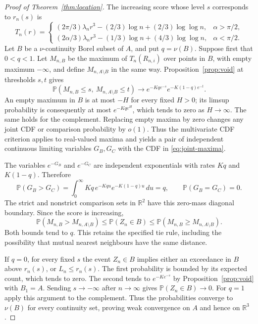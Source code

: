 \documentclass[11pt]{article}
\newcommand{\PP}{\mathbb P}
\begin{document}
\begin{proof}[Proof of Theorem~\ref{thm:location}]
The increasing score whose level $s$ corresponds to $r_n(s)$ is
\[
 T_n(r)=
 \begin{cases}
  (2\pi/3)\lambda_nr^3-(2/3)\log n+(2/3)\log\log n,&\alpha>\pi/2,\\
  (2\alpha/3)\lambda_nr^3-(1/3)\log n+(4/3)\log\log n,&\alpha<\pi/2.
 \end{cases}
\]
Let $B$ be a $\nu$-continuity Borel subset of $A$, and put $q=\nu(B)$.
Suppose first that $0<q<1$. Let $M_{n,B}$ be the maximum of
$T_n(R_{n,i})$ over points in $B$, with empty maximum $-\infty$, and
define $M_{n,A\setminus B}$ in the same way. Proposition~\ref{prop:void}
at thresholds $s,t$ gives
\begin{equation}\label{eq:joint-maxima}
 \PP(M_{n,B}\leq s,\ M_{n,A\setminus B}\leq t)
 \longrightarrow e^{-Kq e^{-s}}e^{-K(1-q)e^{-t}}.
\end{equation}
An empty maximum in $B$ is at most $-H$ for every fixed $H>0$; its
limsup probability is consequently at most $e^{-Kq e^H}$, which tends
to zero as $H\to\infty$. The same holds for the complement. Replacing
empty maxima by zero changes any joint CDF or comparison probability by
$o(1)$. Thus the multivariate CDF criterion applies to real-valued maxima
and yields a pair of independent continuous limiting variables $G_B,G_C$
with the CDF in \eqref{eq:joint-maxima}.

The variables $e^{-G_B}$ and $e^{-G_C}$ are independent exponentials
with rates $Kq$ and $K(1-q)$. Therefore
\[
 \PP(G_B>G_C)=
 \int_0^\infty Kq\,e^{-Kq u}e^{-K(1-q)u}\,du=q,
 \qquad \PP(G_B=G_C)=0.
\]
The strict and nonstrict comparison sets in $\mathbb R^2$ have this
zero-mass diagonal boundary. Since the score is increasing,
\[
 \PP(M_{n,B}>M_{n,A\setminus B})
 \leq\PP(Z_n\in B)\leq
 \PP(M_{n,B}\geq M_{n,A\setminus B}).
\]
Both bounds tend to $q$. This retains the specified tie rule, including
the possibility that mutual nearest neighbours have the same distance.

If $q=0$, for every fixed $s$ the event $Z_n\in B$ implies either an
exceedance in $B$ above $r_n(s)$, or $L_n\leq r_n(s)$. The first probability
is bounded by its expected count, which tends to zero. The second tends to
$e^{-Ke^{-s}}$ by Proposition~\ref{prop:void} with $B_1=A$. Sending
$s\to-\infty$ after $n\to\infty$ gives $\PP(Z_n\in B)\to0$.
For $q=1$ apply this argument to the complement. Thus the probabilities
converge to $\nu(B)$ for every continuity set, proving weak convergence
on $A$ and hence on $\mathbb R^3$.
\end{proof}
\end{document}
